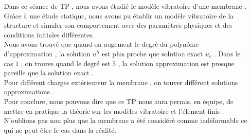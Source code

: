 \documentclass[a4paper,10pt]{report} %
\begin{document}
Dans ce séance de TP , nous avons étudié le modèle vibratoire d'une membrane . Grâce à une étude statique, nous avons pu établir un modèle vibratoire de la structure et simuler son comportement avec des paramètres physiques et des conditions initiales différentes.\\


Nous avons trouvé que quand on augement le degré du polynôme d'approximation , la solution $u^h$ est plus proche que solution exact $u_e$ .
Dans le cas $1$ , on trouve quand le degré est $5$ ,  la solution approximation est presque pareille que la solution exact .\\

Pour différent charges extérieursur la membrane , on  touver différent solutions approximations . \\

Pour conclure, nous pouvons dire que ce TP nous aura permis, en équipe, de mettre en pratique la théorie sur les modèles vibratoire et l'élement finis .  N'oublions pas non plus que la membrane a été considéré comme indéformable ce qui ne peut être le cas dans la réalité.









%
%	
\end{document}

